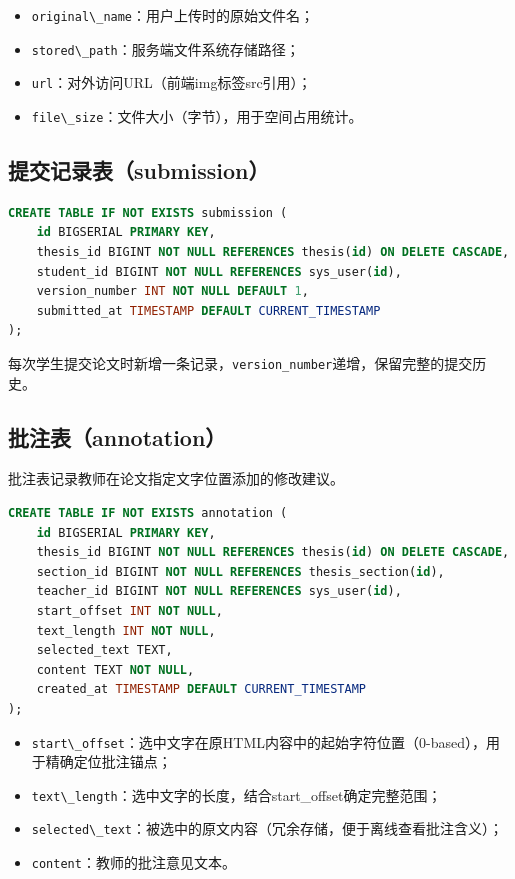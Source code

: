 \begin{itemize}
    \item \verb|original\_name|：用户上传时的原始文件名；
    \item \verb|stored\_path|：服务端文件系统存储路径；
    \item \verb|url|：对外访问URL（前端img标签src引用）；
    \item \verb|file\_size|：文件大小（字节），用于空间占用统计。
\end{itemize}

\subsection{提交记录表（submission）}

\begin{lstlisting}[language=SQL,caption={submission 建表语句}]
CREATE TABLE IF NOT EXISTS submission (
    id BIGSERIAL PRIMARY KEY,
    thesis_id BIGINT NOT NULL REFERENCES thesis(id) ON DELETE CASCADE,
    student_id BIGINT NOT NULL REFERENCES sys_user(id),
    version_number INT NOT NULL DEFAULT 1,
    submitted_at TIMESTAMP DEFAULT CURRENT_TIMESTAMP
);
\end{lstlisting}

每次学生提交论文时新增一条记录，\verb|version_number|递增，保留完整的提交历史。

\subsection{批注表（annotation）}

批注表记录教师在论文指定文字位置添加的修改建议。

\begin{lstlisting}[language=SQL,caption={annotation 建表语句}]
CREATE TABLE IF NOT EXISTS annotation (
    id BIGSERIAL PRIMARY KEY,
    thesis_id BIGINT NOT NULL REFERENCES thesis(id) ON DELETE CASCADE,
    section_id BIGINT NOT NULL REFERENCES thesis_section(id),
    teacher_id BIGINT NOT NULL REFERENCES sys_user(id),
    start_offset INT NOT NULL,
    text_length INT NOT NULL,
    selected_text TEXT,
    content TEXT NOT NULL,
    created_at TIMESTAMP DEFAULT CURRENT_TIMESTAMP
);
\end{lstlisting}

\begin{itemize}
    \item \verb|start\_offset|：选中文字在原HTML内容中的起始字符位置（0-based），用于精确定位批注锚点；
    \item \verb|text\_length|：选中文字的长度，结合start\_offset确定完整范围；
    \item \verb|selected\_text|：被选中的原文内容（冗余存储，便于离线查看批注含义）；
    \item \verb|content|：教师的批注意见文本。
\end{itemize}

